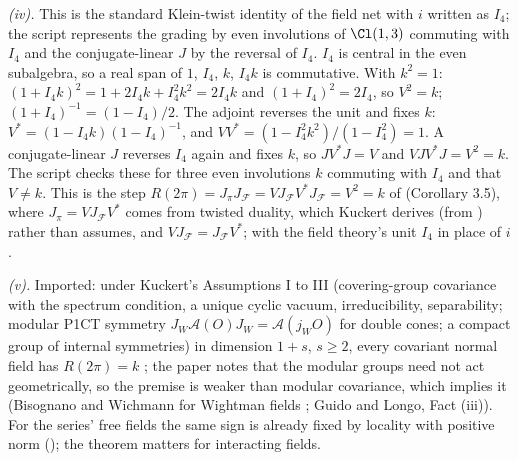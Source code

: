 \emph{(iv).} This is the standard Klein-twist identity of the field net with $i$ written as $I_{4}$; the script represents the grading by even involutions of $\Cl(1,3)$ commuting with $I_{4}$ and the conjugate-linear $J$ by the reversal of $I_{4}$. $I_{4}$ is central in the even subalgebra, so a real span of $1$, $I_{4}$, $k$, $I_{4}k$ is commutative. With $k^{2} = 1$: $(1 + I_{4}k)^{2} = 1 + 2I_{4}k + I_{4}^{2}k^{2} = 2I_{4}k$ and $(1 + I_{4})^{2} = 2I_{4}$, so $V^{2} = k$; $(1 + I_{4})^{-1} = (1 - I_{4})/2$. The adjoint reverses the unit and fixes $k$: $V^{*} = (1 - I_{4}k)(1 - I_{4})^{-1}$, and $VV^{*} = (1 - I_{4}^{2}k^{2})/(1 - I_{4}^{2}) = 1$. A conjugate-linear $J$ reverses $I_{4}$ again and fixes $k$, so $JV^{*}J = V$ and $VJV^{*}J = V^{2} = k$. The script checks these for three even involutions $k$ commuting with $I_{4}$ and that $V \ne k$. This is the step $R(2\pi) = J_{\pi}J_{\mathcal{F}} = VJ_{\mathcal{F}}V^{*}J_{\mathcal{F}} = V^{2} = k$ of \cite{Kuckert1995} (Corollary 3.5), where $J_{\pi} = VJ_{\mathcal{F}}V^{*}$ comes from twisted duality, which Kuckert derives (from \cite{DoplicherRoberts1990}) rather than assumes, and $VJ_{\mathcal{F}} = J_{\mathcal{F}}V^{*}$; with the field theory's unit $I_{4}$ in place of $i$.

\emph{(v).} Imported: under Kuckert's Assumptions I to III (covering-group covariance with the spectrum condition, a unique cyclic vacuum, irreducibility, separability; modular P1CT symmetry $J_{W}\mathcal{A}(O)J_{W} = \mathcal{A}(j_{W}O)$ for double cones; a compact group of internal symmetries) in dimension $1 + s$, $s \ge 2$, every covariant normal field has $R(2\pi) = k$ \cite{Kuckert1995}; the paper notes that the modular groups need not act geometrically, so the premise is weaker than modular covariance, which implies it (Bisognano and Wichmann for Wightman fields \cite{BW1976}; Guido and Longo, Fact (iii)). For the series' free fields the same sign is already fixed by locality with positive norm (); the theorem matters for interacting fields.

